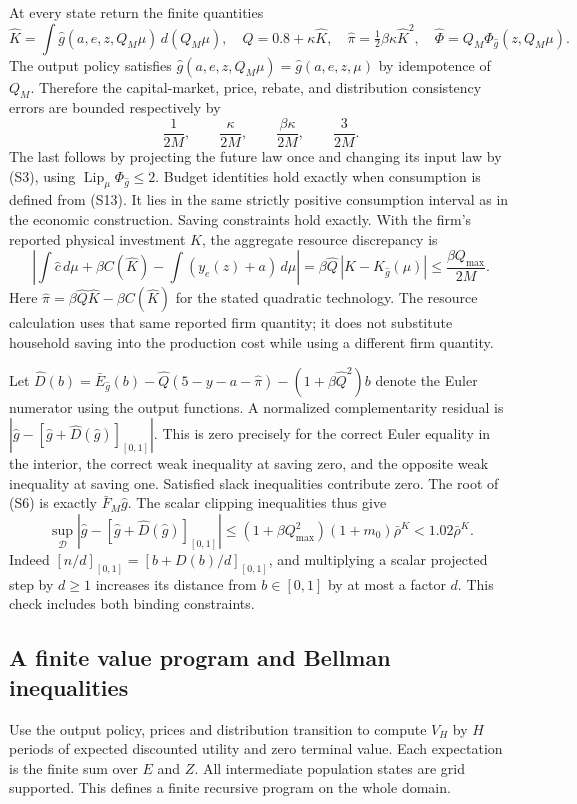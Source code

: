 \documentclass[11pt,a4paper]{article}
\begin{document}
At every state return the finite quantities
\[
 \hat K=\int\hat g(a,e,z,Q_M\mu)\,d(Q_M\mu),\quad
 \hat Q=0.8+\kappa\hat K,\quad
 \hat\pi=\tfrac12\beta\kappa\hat K^2,\quad
 \hat\Phi=Q_M\Phi_{\hat g}(z,Q_M\mu).
 \tag{S13}
\]
The output policy satisfies $\hat g(a,e,z,Q_M\mu)=\hat g(a,e,z,\mu)$
by idempotence of $Q_M$. Therefore the capital-market, price, rebate,
and distribution consistency errors are bounded respectively by
\[
 \frac1{2M},\qquad \frac{\kappa}{2M},\qquad
 \frac{\beta\kappa}{2M},\qquad \frac3{2M}.
 \tag{S14}
\]
The last follows by projecting the future law once and changing its
input law by \textup{(S3)}, using $\operatorname{Lip}_\mu\Phi_{\hat g}\leq2$.
Budget identities hold exactly when consumption is defined from
\textup{(S13)}. It lies in the same strictly positive consumption
interval as in the economic construction. Saving constraints hold
exactly. With the firm's reported physical investment $\hat K$,
the aggregate resource discrepancy is
\[
 \left|\int\hat c\,d\mu+\beta C(\hat K)
              -\int(y_e(z)+a)\,d\mu\right|
 =\beta\hat Q\,|\hat K-K_{\hat g}(\mu)|
 \leq\frac{\beta Q_{\max}}{2M}.
 \tag{S14a}
\]
Here $\hat\pi=\beta\hat Q\hat K-\beta C(\hat K)$ for the stated
quadratic technology. The resource calculation uses that same
reported firm quantity; it does not substitute household saving
into the production cost while using a different firm quantity.

Let $\hat D(b)=\bar E_{\hat g}(b)-
\hat Q(5-y-a-\hat\pi)-(1+\beta\hat Q^2)b$ denote the Euler numerator
using the output functions. A normalized complementarity residual is
$|\hat g-[\hat g+\hat D(\hat g)]_{[0,1]}|$.
This is zero precisely for the correct Euler equality in the interior,
the correct weak inequality at saving zero, and the opposite weak
inequality at saving one. Satisfied slack inequalities contribute zero.
The root of \textup{(S6)} is exactly $\bar F_M\hat g$.
The scalar clipping inequalities thus give
\[
 \sup_{\mathcal D}
 |\hat g-[\hat g+\hat D(\hat g)]_{[0,1]}|
 \leq(1+\beta Q_{\max}^2)(1+m_0)\bar\rho^K
 <1.02\bar\rho^K.
 \tag{S15}
\]
Indeed $[n/d]_{[0,1]}=[b+D(b)/d]_{[0,1]}$, and multiplying a scalar
projected step by $d\geq1$ increases its distance from $b\in[0,1]$
by at most a factor $d$. This check includes both binding constraints.

\subsection{A finite value program and Bellman inequalities}
Use the output policy, prices and distribution transition to compute
$V_H$ by $H$ periods of expected discounted utility and zero terminal
value. Each expectation is the finite sum over $E$ and $Z$.
All intermediate population states are grid supported. This defines
a finite recursive program on the whole domain.
\end{document}
